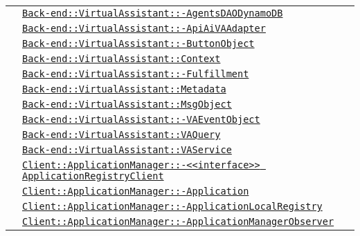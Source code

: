 \begin{longtable}{|>{\centering}m{3cm}|m{10cm}<{\centering}|}
& \hyperref[Back-end::VirtualAssistant::AgentsDAODynamoDB]{\texttt{Back-end::VirtualAssistant::-\linebreak AgentsDAODynamoDB}}\\
& \hyperref[Back-end::VirtualAssistant::ApiAiVAAdapter]{\texttt{Back-end::VirtualAssistant::-\linebreak ApiAiVAAdapter}}\\
& \hyperref[Back-end::VirtualAssistant::ButtonObject]{\texttt{Back-end::VirtualAssistant::-\linebreak ButtonObject}}\\
& \hyperref[Back-end::VirtualAssistant::Context]{\texttt{Back-end::VirtualAssistant::Context}}\\
& \hyperref[Back-end::VirtualAssistant::Fulfillment]{\texttt{Back-end::VirtualAssistant::-\linebreak Fulfillment}}\\
& \hyperref[Back-end::VirtualAssistant::Metadata]{\texttt{Back-end::VirtualAssistant::Metadata}}\\
& \hyperref[Back-end::VirtualAssistant::MsgObject]{\texttt{Back-end::VirtualAssistant::MsgObject}}\\
& \hyperref[Back-end::VirtualAssistant::VAEventObject]{\texttt{Back-end::VirtualAssistant::-\linebreak VAEventObject}}\\
& \hyperref[Back-end::VirtualAssistant::VAQuery]{\texttt{Back-end::VirtualAssistant::VAQuery}}\\
& \hyperref[Back-end::VirtualAssistant::VAService]{\texttt{Back-end::VirtualAssistant::VAService}}\\
& \hyperref[Client::ApplicationManager::<<interface>> ApplicationRegistryClient]{\texttt{Client::ApplicationManager::-\linebreak <<interface>> ApplicationRegistryClient}}\\
& \hyperref[Client::ApplicationManager::Application]{\texttt{Client::ApplicationManager::-\linebreak Application}}\\
& \hyperref[Client::ApplicationManager::ApplicationLocalRegistry]{\texttt{Client::ApplicationManager::-\linebreak ApplicationLocalRegistry}}\\
& \hyperref[Client::ApplicationManager::ApplicationManagerObserver]{\texttt{Client::ApplicationManager::-\linebreak ApplicationManagerObserver}}\\

\end{longtable}

